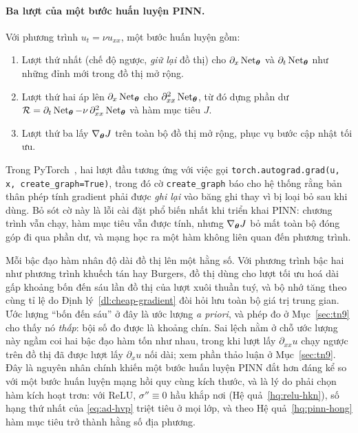 \paragraph{Ba lượt của một bước huấn luyện PINN.}
Với phương trình $u_t = \nu u_{xx}$, một bước huấn luyện gồm:
\begin{enumerate}[label=(\arabic*), leftmargin=*]
\item Lượt thứ nhất (chế độ ngược, \emph{giữ lại} đồ thị) cho $\partial_x
      \operatorname{Net}_{\bm{\theta}}$ và $\partial_t\operatorname{Net}_{\bm{\theta}}$ như những đỉnh mới trong đồ
      thị mở rộng.
\item Lượt thứ hai áp lên $\partial_x\operatorname{Net}_{\bm{\theta}}$ cho
      $\partial^2_{xx}\operatorname{Net}_{\bm{\theta}}$, từ đó dựng phần dư
      $\mathcal{R} = \partial_t\operatorname{Net}_{\bm{\theta}} - \nu\,\partial^2_{xx}
      \operatorname{Net}_{\bm{\theta}}$ và hàm mục tiêu $J$.
\item Lượt thứ ba lấy $\nabla_{\bm{\theta}} J$ trên toàn bộ đồ thị mở rộng, phục vụ
      bước cập nhật tối ưu.
\end{enumerate}
Trong PyTorch~\cite{paszke2019}, hai lượt đầu tương ứng với việc gọi
\texttt{torch.autograd.grad(u, x, create\_graph=True)}, trong đó cờ
\texttt{create\_graph} báo cho hệ thống rằng bản thân phép tính gradient phải được
\emph{ghi lại} vào băng ghi thay vì bị loại bỏ sau khi dùng. Bỏ sót cờ này là lỗi
cài đặt phổ biến nhất khi triển khai PINN: chương trình vẫn chạy, hàm mục tiêu
vẫn được tính, nhưng $\nabla_{\bm{\theta}} J$ bỏ mất toàn bộ đóng góp đi qua phần dư,
và mạng học ra một hàm không liên quan đến phương trình.
 
\begin{nhanxet}
\label{nx:chi-phi-bac-cao}
Mỗi bậc đạo hàm nhân độ dài đồ thị lên một hằng số. Với phương trình bậc hai như
phương trình khuếch tán hay Burgers, đồ thị dùng cho lượt tối ưu hoá dài gấp
khoảng bốn đến sáu lần đồ thị của lượt xuôi thuần tuý, và bộ nhớ tăng theo cùng
tỉ lệ do Định lý~\ref{dl:cheap-gradient} đòi hỏi lưu toàn bộ giá trị trung gian.
Ước lượng ``bốn đến sáu'' ở đây là ước lượng \emph{a priori}, và phép đo ở
Mục~\ref{sec:tn9} cho thấy nó \emph{thấp}: bội số đo được là khoảng chín. Sai
lệch nằm ở chỗ ước lượng này ngầm coi hai bậc đạo hàm tốn như nhau, trong khi
lượt lấy $\partial_{xx}u$ chạy ngược trên đồ thị đã được lượt lấy
$\partial_{x}u$ nối dài; xem phần thảo luận ở Mục~\ref{sec:tn9}.
Đây là nguyên nhân chính khiến một bước huấn luyện PINN đắt hơn đáng kể so với
một bước huấn luyện mạng hồi quy cùng kích thước, và là lý do phải chọn hàm kích
hoạt trơn: với ReLU, $\sigma'' \equiv 0$ hầu khắp nơi
(Hệ quả~\ref{hq:relu-hkn}), số hạng thứ nhất của \eqref{eq:ad-hvp} triệt tiêu ở
mọi lớp, và theo Hệ quả~\ref{hq:pinn-hong} hàm mục tiêu trở thành hằng số địa
phương.
\end{nhanxet}
 
